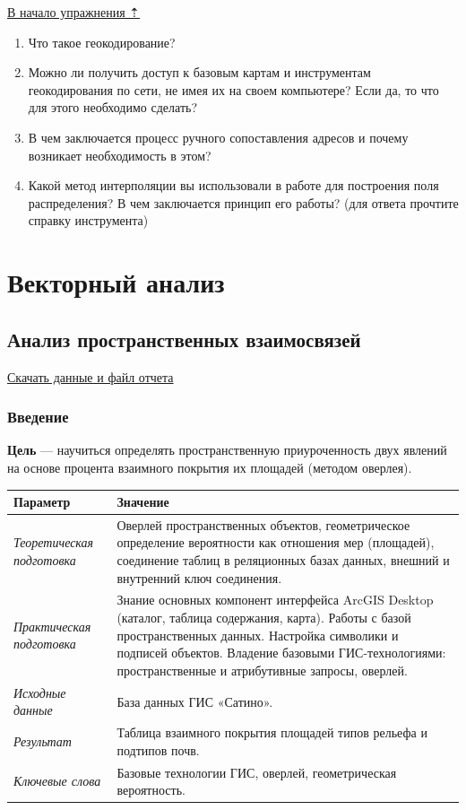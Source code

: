 \documentclass[12pt,]{book}
\begin{document}
\protect\hyperlink{geocoding}{В начало упражнения ⇡}

\begin{enumerate}
\def\labelenumi{\arabic{enumi}.}
\item
  Что такое геокодирование?
\item
  Можно ли получить доступ к базовым картам и инструментам геокодирования по сети, не имея их на своем компьютере? Если да, то что для этого необходимо сделать?
\item
  В чем заключается процесс ручного сопоставления адресов и почему возникает необходимость в этом?
\item
  Какой метод интерполяции вы использовали в работе для построения поля распределения? В чем заключается принцип его работы? (для ответа прочтите справку инструмента)
\end{enumerate}

\hypertarget{part---1}{%
\part{Векторный анализ}\label{part---1}}

\hypertarget{overlay}{%
\chapter{Анализ пространственных взаимосвязей}\label{overlay}}

\href{http://autolab.geogr.msu.ru/gis/data/Ex10.zip}{Скачать данные и файл отчета}

\hypertarget{overlay-intro}{%
\section{Введение}\label{overlay-intro}}

\textbf{Цель} --- научиться определять пространственную приуроченность двух явлений на основе процента взаимного покрытия их площадей (методом оверлея).

\begin{longtable}[]{@{}ll@{}}
\toprule
Параметр & Значение\tabularnewline
\midrule
\endhead
\emph{Теоретическая подготовка} & Оверлей пространственных объектов, геометрическое определение вероятности как отношения мер (площадей), соединение таблиц в реляционных базах данных, внешний и внутренний ключ соединения.\tabularnewline
\emph{Практическая подготовка} & Знание основных компонент интерфейса ArcGIS Desktop (каталог, таблица содержания, карта). Работы с базой пространственных данных. Настройка символики и подписей объектов. Владение базовыми ГИС-технологиями: пространственные и атрибутивные запросы, оверлей.\tabularnewline
\emph{Исходные данные} & База данных ГИС «Сатино».\tabularnewline
\emph{Результат} & Таблица взаимного покрытия площадей типов рельефа и подтипов почв.\tabularnewline
\emph{Ключевые слова} & Базовые технологии ГИС, оверлей, геометрическая вероятность.\tabularnewline
\bottomrule
\end{longtable}
\end{document}
